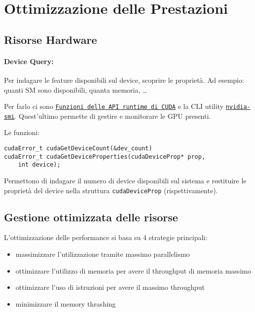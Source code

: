 \section{Ottimizzazione delle Prestazioni}

\subsection{Risorse Hardware}

\paragraph{Device Query:} Per indagare le feature disponibili sul device, scoprire le proprietà. Ad esempio: quanti SM sono disponibili, quanta memoria, \dots

Per farlo ci sono \href{http://docs.nvidia.com/cuda/cuda-runtime-api}{\texttt{Funzioni delle API runtime di CUDA}} e la CLI utility \href{https://developer.nvidia.com/nvidia-system-management-interface}{\texttt{nvidia-smi}}. Quest'ultimo permette di gestire e monitorare le GPU presenti.

Le funzioni: 
\begin{verbatim}
cudaError_t cudaGetDeviceCount(&dev_count)
cudaError_t cudaGetDeviceProperties(cudaDeviceProp* prop,
	int device);
\end{verbatim}
Permettono di indagare il numero di device disponibili sul sistema e restituire le proprietà del device nella struttura \texttt{cudaDeviceProp} (rispettivamente).

\subsection{Gestione ottimizzata delle risorse}

L'ottimizzazione delle performance si basa su 4 strategie principali:
\begin{itemize}
	\item massimizzare l'utilizzazione tramite massimo parallelismo
	
	\item ottimizzare l'utilizzo di memoria per avere il throughput di memoria massimo
	
	\item ottimizzare l'uso di istruzioni per avere il massimo throughput
	
	\item minimizzare il memory thrashing
\end{itemize}

